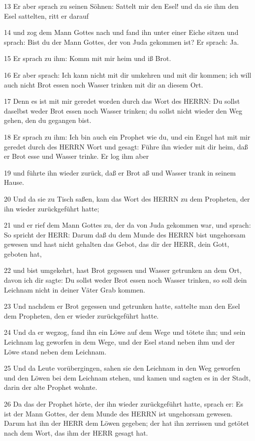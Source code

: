 \par 13 Er aber sprach zu seinen Söhnen: Sattelt mir den Esel! und da sie ihm den Esel sattelten, ritt er darauf
\par 14 und zog dem Mann Gottes nach und fand ihn unter einer Eiche sitzen und sprach: Bist du der Mann Gottes, der von Juda gekommen ist? Er sprach: Ja.
\par 15 Er sprach zu ihm: Komm mit mir heim und iß Brot.
\par 16 Er aber sprach: Ich kann nicht mit dir umkehren und mit dir kommen; ich will auch nicht Brot essen noch Wasser trinken mit dir an diesem Ort.
\par 17 Denn es ist mit mir geredet worden durch das Wort des HERRN: Du sollst daselbst weder Brot essen noch Wasser trinken; du sollst nicht wieder den Weg gehen, den du gegangen bist.
\par 18 Er sprach zu ihm: Ich bin auch ein Prophet wie du, und ein Engel hat mit mir geredet durch des HERRN Wort und gesagt: Führe ihn wieder mit dir heim, daß er Brot esse und Wasser trinke. Er log ihm aber
\par 19 und führte ihn wieder zurück, daß er Brot aß und Wasser trank in seinem Hause.
\par 20 Und da sie zu Tisch saßen, kam das Wort des HERRN zu dem Propheten, der ihn wieder zurückgeführt hatte;
\par 21 und er rief dem Mann Gottes zu, der da von Juda gekommen war, und sprach: So spricht der HERR: Darum daß du dem Munde des HERRN bist ungehorsam gewesen und hast nicht gehalten das Gebot, das dir der HERR, dein Gott, geboten hat,
\par 22 und bist umgekehrt, hast Brot gegessen und Wasser getrunken an dem Ort, davon ich dir sagte: Du sollst weder Brot essen noch Wasser trinken, so soll dein Leichnam nicht in deiner Väter Grab kommen.
\par 23 Und nachdem er Brot gegessen und getrunken hatte, sattelte man den Esel dem Propheten, den er wieder zurückgeführt hatte.
\par 24 Und da er wegzog, fand ihn ein Löwe auf dem Wege und tötete ihn; und sein Leichnam lag geworfen in dem Wege, und der Esel stand neben ihm und der Löwe stand neben dem Leichnam.
\par 25 Und da Leute vorübergingen, sahen sie den Leichnam in den Weg geworfen und den Löwen bei dem Leichnam stehen, und kamen und sagten es in der Stadt, darin der alte Prophet wohnte.
\par 26 Da das der Prophet hörte, der ihn wieder zurückgeführt hatte, sprach er: Es ist der Mann Gottes, der dem Munde des HERRN ist ungehorsam gewesen. Darum hat ihn der HERR dem Löwen gegeben; der hat ihn zerrissen und getötet nach dem Wort, das ihm der HERR gesagt hat.
